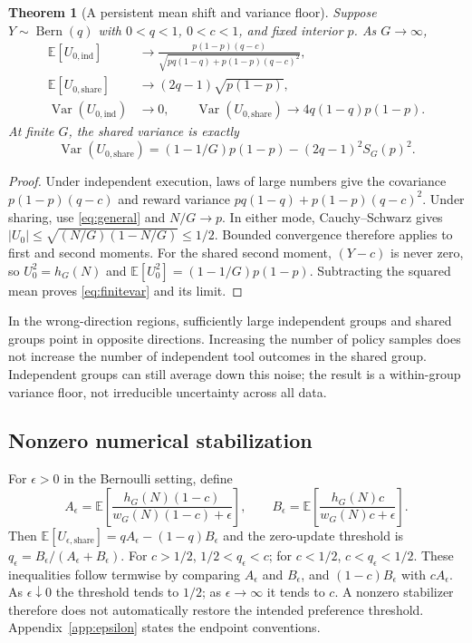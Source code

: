 \documentclass[10pt,letterpaper]{article}
\newtheorem{theorem}{Theorem}
\newcommand{\E}{\mathbb{E}}
\newcommand{\Var}{\operatorname{Var}}
\newcommand{\Bern}{\operatorname{Bern}}
\newcommand{\ind}{\mathrm{ind}}
\newcommand{\shr}{\mathrm{share}}
\begin{document}
\begin{theorem}[A persistent mean shift and variance floor]
\label{thm:variance}
Suppose $Y\sim\Bern(q)$ with $0<q<1$, $0<c<1$, and fixed interior $p$.
As $G\to\infty$,
\begin{align}
\E[U_{0,\ind}]&\longrightarrow
\frac{p(1-p)(q-c)}{\sqrt{p q(1-q)+p(1-p)(q-c)^2}},
\label{eq:freshlimit}\\
\E[U_{0,\shr}]&\longrightarrow (2q-1)\sqrt{p(1-p)},
\label{eq:sharelimit}\\
\Var(U_{0,\ind})&\longrightarrow0,\qquad
\Var(U_{0,\shr})\longrightarrow4q(1-q)p(1-p).
\label{eq:varlimit}
\end{align}
At finite $G$, the shared variance is exactly
\begin{equation}
\Var(U_{0,\shr})=(1-1/G)p(1-p)-(2q-1)^2S_G(p)^2.
\label{eq:finitevar}
\end{equation}
\end{theorem}
\begin{proof}
Under independent execution, laws of large numbers give the covariance
$p(1-p)(q-c)$ and reward variance $pq(1-q)+p(1-p)(q-c)^2$.
Under sharing, use \eqref{eq:general} and $N/G\to p$. In either mode,
Cauchy--Schwarz gives $|U_0|\leq\sqrt{(N/G)(1-N/G)}\leq1/2$.
Bounded convergence therefore applies to first and second moments. For the
shared second moment, $(Y-c)$ is never zero, so $U_0^2=h_G(N)$ and
$\E[U_0^2]=(1-1/G)p(1-p)$. Subtracting the squared mean proves
\eqref{eq:finitevar} and its limit.
\end{proof}
In the wrong-direction regions, sufficiently large independent groups and
shared groups point in opposite directions. Increasing the number of policy
samples does not increase the number of independent tool outcomes in the
shared group. Independent groups can still average down this noise; the result
is a within-group variance floor, not irreducible uncertainty across all data.

\subsection{Nonzero numerical stabilization}
For $\epsilon>0$ in the Bernoulli setting, define
\begin{equation}
A_\epsilon=\E\!\left[\frac{h_G(N)(1-c)}{w_G(N)(1-c)+\epsilon}\right],\qquad
B_\epsilon=\E\!\left[\frac{h_G(N)c}{w_G(N)c+\epsilon}\right].
\end{equation}
Then $\E[U_{\epsilon,\shr}]=qA_\epsilon-(1-q)B_\epsilon$ and the zero-update
threshold is $q_\epsilon=B_\epsilon/(A_\epsilon+B_\epsilon)$.
For $c>1/2$, $1/2<q_\epsilon<c$; for $c<1/2$, $c<q_\epsilon<1/2$.
These inequalities follow termwise by comparing $A_\epsilon$ and
$B_\epsilon$, and $(1-c)B_\epsilon$ with $cA_\epsilon$.
As $\epsilon\downarrow0$ the threshold tends to $1/2$; as
$\epsilon\to\infty$ it tends to $c$. A nonzero stabilizer therefore does not
automatically restore the intended preference threshold. Appendix~\ref{app:epsilon}
states the endpoint conventions.
\end{document}

